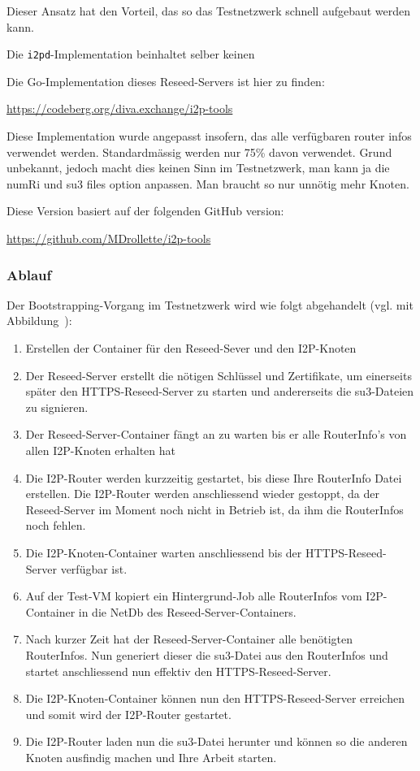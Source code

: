 Dieser Ansatz hat den Vorteil, das so das Testnetzwerk schnell aufgebaut werden kann.

Die \lstinline|i2pd|-Implementation beinhaltet selber keinen 

Die Go-Implementation dieses Reseed-Servers ist hier zu finden:

\url{https://codeberg.org/diva.exchange/i2p-tools}

Diese Implementation wurde angepasst insofern, das alle verfügbaren router infos verwendet werden. Standardmässig werden nur 75\% davon verwendet. Grund unbekannt, jedoch macht dies keinen Sinn im Testnetzwerk, man kann ja die numRi und su3 files option anpassen. Man braucht so nur unnötig mehr Knoten.

Diese Version basiert auf der folgenden GitHub version:

\url{https://github.com/MDrollette/i2p-tools}


\subsubsection{Ablauf}

Der Bootstrapping-Vorgang im Testnetzwerk wird wie folgt abgehandelt (vgl. mit Abbildung~):

\begin{enumerate}
    \item Erstellen der Container für den Reseed-Sever und den I2P-Knoten
    \item Der Reseed-Server erstellt die nötigen Schlüssel und Zertifikate, um einerseits später den HTTPS-Reseed-Server zu starten und andererseits die su3-Dateien zu signieren.
    \item Der Reseed-Server-Container fängt an zu warten bis er alle RouterInfo's von allen I2P-Knoten erhalten hat
    \item Die I2P-Router werden kurzzeitig gestartet, bis diese Ihre RouterInfo Datei erstellen. Die I2P-Router werden anschliessend wieder gestoppt, da der Reseed-Server im Moment noch nicht in Betrieb ist, da ihm die RouterInfos noch fehlen.
    \item Die I2P-Knoten-Container warten anschliessend bis der HTTPS-Reseed-Server verfügbar ist.
    \item Auf der Test-VM kopiert ein Hintergrund-Job alle RouterInfos vom I2P-Container in die NetDb des Reseed-Server-Containers.
    \item Nach kurzer Zeit hat der Reseed-Server-Container alle benötigten RouterInfos. Nun generiert dieser die su3-Datei aus den RouterInfos und startet anschliessend nun effektiv den HTTPS-Reseed-Server.
    \item Die I2P-Knoten-Container können nun den HTTPS-Reseed-Server erreichen und somit wird der I2P-Router gestartet.
    \item Die I2P-Router laden nun die su3-Datei herunter und können so die anderen Knoten ausfindig machen und Ihre Arbeit starten.
\end{enumerate}

